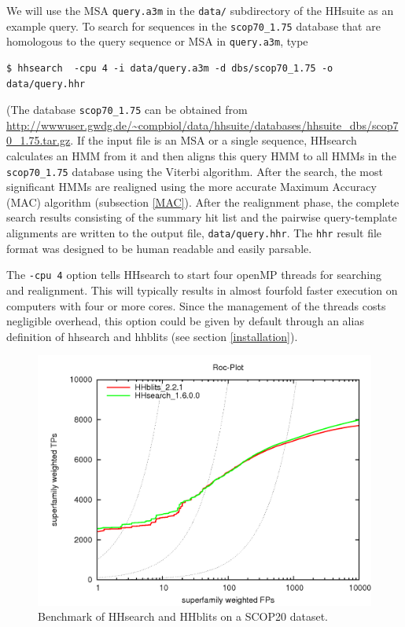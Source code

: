 \documentclass[11pt,a4paper]{article}
\begin{document}
We will use the MSA \verb`query.a3m` in the \verb`data/` subdirectory of the HHsuite as an example query. To search for sequences in the \verb`scop70_1.75` database that are homologous to the query sequence or MSA in \verb`query.a3m`, type

\begin{verbatim}
$ hhsearch  -cpu 4 -i data/query.a3m -d dbs/scop70_1.75 -o data/query.hhr
\end{verbatim}

(The database \verb`scop70_1.75` can be obtained from \url{http://wwwuser.gwdg.de/~compbiol/data/hhsuite/databases/hhsuite_dbs/scop70_1.75.tar.gz}. 
If the input file is an MSA or a single sequence, HHsearch calculates an HMM from it
and then aligns this query HMM to all HMMs in the \verb`scop70_1.75` database using the Viterbi 
algorithm. After the search, 
the most significant HMMs are realigned using the more accurate Maximum Accuracy (MAC) 
algorithm (subsection \ref{MAC}). After the realignment phase, the complete search results consisting of the 
summary hit list and the pairwise query-template alignments are written to the output file, \verb`data/query.hhr`.
The \verb`hhr` result file format was designed to be human readable and easily parsable.

The \verb`-cpu 4` option tells HHsearch to start four openMP threads for searching and realignment. This will typically results in almost fourfold faster execution on computers with four or more cores. Since the management of the threads costs negligible overhead, this option could be given by default through an alias definition of hhsearch and hhblits (see section \ref{installation}). 

\begin{figure}[h]
\begin{center}
\includegraphics[width=0.5 \textwidth]{hhblits-hhsearch.png}
\caption{Benchmark of HHsearch and HHblits on a SCOP20 dataset.}
\label{fig:hhsearch_hhblits_bench}
\end{center}
\end{figure}
\end{document}
